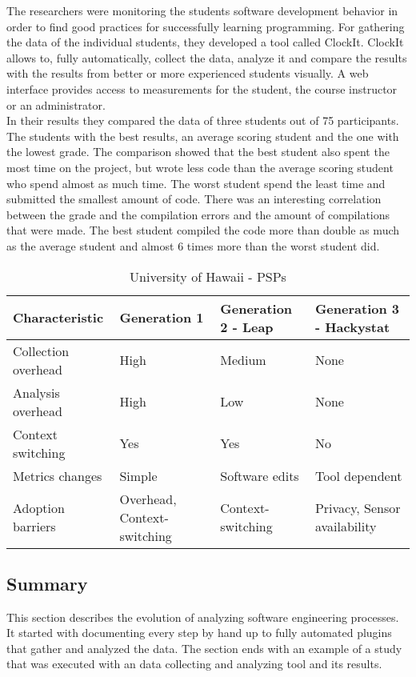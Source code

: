 The researchers were monitoring the students software development behavior in order to find good practices for successfully learning programming. For gathering the data of the individual students, they developed a tool called ClockIt. ClockIt allows to, fully automatically, collect the data, analyze it and compare the results with the results from better or more experienced students visually. A web interface provides access to measurements for the student, the course instructor or an administrator.\\
In their results they compared the data of three students out of 75 participants. The students with the best results, an average scoring student and the one with the lowest grade. 
The comparison showed that the best student also spent the most time on the project, but wrote less code than the average scoring student who spend almost as much time. The worst student spend the least time and submitted the smallest amount of code. There was an interesting correlation between the grade and the compilation errors and the amount of compilations that were made. The best student compiled the code more than double as much as the average student and almost 6 times more than the worst student did. \cite{norris2008clockit}

\begin{table}[ht]
  \begin{tabular}{|P{5cm}|P{3cm}|P{3cm}|P{3cm}|}
  \hline
   \textbf{Characteristic}	& \textbf{Generation 1} & \textbf{Generation 2 - Leap} & \textbf{Generation 3 - Hackystat} \\ \hline
	Collection overhead	& High 											& Medium  				& None \\ \hline
	Analysis overhead	& High 											& Low 						& None \\ \hline
	Context switching	& Yes 											& Yes 						& No \\ \hline
	Metrics changes		& Simple 										& Software edits		& Tool dependent \\ \hline
	Adoption barriers		& Overhead, Context-switching 	& Context-switching	& Privacy, Sensor availability \\ \hline
  \end{tabular}
  \newline\newline
  \caption{University of Hawaii - PSPs}\label{psps}
\end{table}

\subsection{Summary}
This section describes the evolution of analyzing software engineering processes. It started with documenting every step by hand up to fully automated plugins that gather and analyzed the data.
The section ends with an example of a study that was executed with an data collecting and analyzing tool and its results. 


